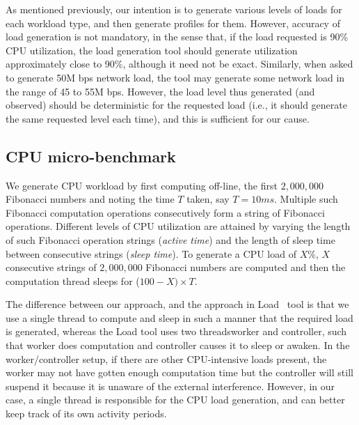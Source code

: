As mentioned previously, our intention is to generate various levels of loads for each
workload type, and then generate profiles for them. However, accuracy of load generation is not
mandatory, in the sense that, if the load requested is 90\% CPU utilization, the load generation
tool should generate utilization approximately close to 90\%, although it need not be exact. 
Similarly, when asked to generate 50M bps network
load, the tool may generate some network load in the range of 45 to 55M bps. However, the load
level thus generated (and observed) should be deterministic for the requested load (i.e., it
should generate the same requested level each time), and this is sufficient for our cause.

\subsection{CPU micro-benchmark}
We generate CPU workload by first computing off-line, the
first $2,000,000$ Fibonacci numbers and noting 
the time $T$ taken, say $T = 10ms$. Multiple such
Fibonacci computation operations consecutively
form a string of Fibonacci operations.
Different levels of CPU utilization are attained
by varying the length of such Fibonacci operation strings (\textit{active time}) and
the length of sleep time between consecutive strings (\textit{sleep time}). To generate a
CPU load of $X\%$, $X$ consecutive strings of $2,000,000$ Fibonacci numbers are
computed %
and then the computation thread sleeps for 
($100-X) \times T$. 

The difference between our approach, and the approach in Load~\cite{load} tool
is that we use a single thread to compute and sleep in such a manner that the 
required load is generated, whereas the Load tool uses two threads\textemdash{}worker and controller, 
such that worker does computation and controller causes it to sleep or awaken. In
the worker/controller setup, if there are other CPU-intensive loads present, the
worker may not have gotten enough computation time but the controller will still
suspend it because it is unaware of the external interference. However, in 
our case, a single thread is responsible for the CPU load generation, and can
better keep track of its own activity periods.

